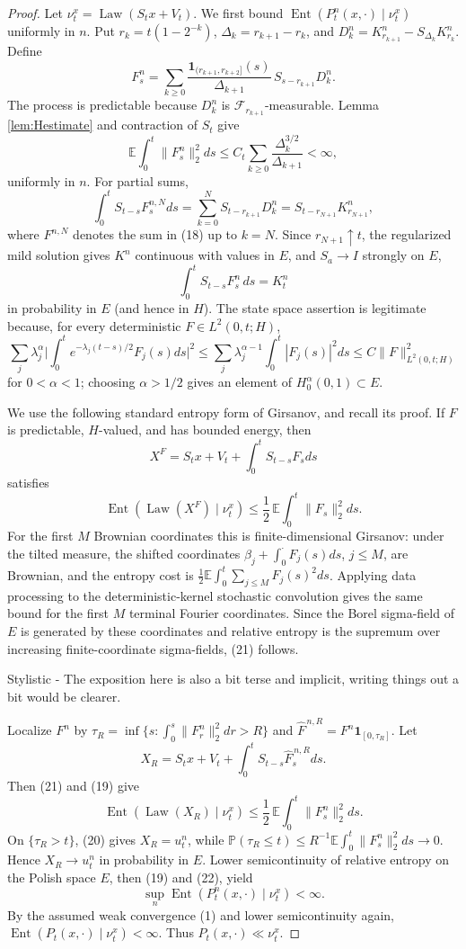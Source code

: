 \documentclass[12pt]{article}
\newcommand{\E}{\mathbb E}
\newcommand{\1}{\mathbf 1}
\newcommand{\Law}{\operatorname{Law}}
\newcommand{\calF}{\mathcal F}
\newcommand{\Ent}{\operatorname{Ent}}
\newcommand{\review}[1]{\begin{reviewbox}#1\end{reviewbox}}
\begin{document}
\begin{proof}
Let \(\nu_t^x=\Law(S_tx+V_t)\).  We first bound
\(\Ent(P_t^n(x,\cdot)\mid\nu_t^x)\) uniformly in \(n\).  Put
\(r_k=t(1-2^{-k})\), \(\Delta_k=r_{k+1}-r_k\), and
\(D_k^n=K^n_{r_{k+1}}-S_{\Delta_k}K^n_{r_k}\).  Define
\[
 F_s^n=\sum_{k\ge0}\frac{\1_{(r_{k+1},r_{k+2}]}(s)}{\Delta_{k+1}}\,
        S_{s-r_{k+1}}D_k^n .                                \tag{18}
\]
The process is predictable because \(D_k^n\) is \(\calF_{r_{k+1}}\)-measurable.
Lemma \ref{lem:Hestimate} and contraction of \(S_t\) give
\[
 \E\int_0^t\|F_s^n\|_2^2ds
 \le C_t\sum_{k\ge0}\frac{\Delta_k^{3/2}}{\Delta_{k+1}}<\infty, \tag{19}
\]
uniformly in \(n\).  For partial sums,
\[
 \int_0^tS_{t-s}F_s^{n,N}ds
 =\sum_{k=0}^NS_{t-r_{k+1}}D_k^n
 =S_{t-r_{N+1}}K^n_{r_{N+1}},
\]
where \(F^{n,N}\) denotes the sum in (18) up to \(k=N\).  Since
\(r_{N+1}\uparrow t\), the regularized mild solution gives \(K^n\) continuous
with values in \(E\), and \(S_a\to I\) strongly on \(E\),
\[
        \int_0^tS_{t-s}F_s^n\,ds=K_t^n                       \tag{20}
\]
in probability in \(E\) (and hence in \(H\)).  The state space assertion is
legitimate because, for every deterministic \(F\in L^2(0,t;H)\),
\[
 \sum_j\lambda_j^\alpha\Big|\int_0^te^{-\lambda_j(t-s)/2}F_j(s)ds\Big|^2
 \le \sum_j\lambda_j^{\alpha-1}\int_0^t|F_j(s)|^2ds
 \le C\|F\|_{L^2(0,t;H)}^2
\]
for \(0<\alpha<1\); choosing \(\alpha>1/2\) gives an element of
\(H^\alpha_0(0,1)\subset E\).

We use the following standard entropy form of Girsanov, and recall its proof.
If \(F\) is predictable, \(H\)-valued, and has bounded energy, then
\[
 X^F=S_tx+V_t+\int_0^tS_{t-s}F_sds
\]
satisfies
\[
        \Ent(\Law(X^F)\mid\nu_t^x)
        \le \frac12\,\E\int_0^t\|F_s\|_2^2ds .               \tag{21}
\]
For the first \(M\) Brownian coordinates this is finite-dimensional
Girsanov: under the tilted measure, the shifted coordinates
\(\beta_j+\int_0^\cdot F_j(s)ds\), \(j\le M\), are Brownian, and the entropy
cost is \(\frac12\E\int_0^t\sum_{j\le M}F_j(s)^2ds\).  Applying data
processing to the deterministic-kernel stochastic convolution gives the same
bound for the first \(M\) terminal Fourier coordinates.  Since the Borel
sigma-field of \(E\) is generated by these coordinates and relative entropy
is the supremum over increasing finite-coordinate sigma-fields, (21) follows. \review{Stylistic - The exposition here is also a bit terse and implicit, writing things out a bit would be clearer.}

Localize \(F^n\) by
\(\tau_R=\inf\{s:\int_0^s\|F_r^n\|_2^2dr>R\}\) and
\(\widehat F^{\,n,R}=F^n\1_{[0,\tau_R]}\).  Let
\[
 X_R=S_tx+V_t+\int_0^tS_{t-s}\widehat F^{\,n,R}_sds .
\]
Then (21) and (19) give
\[
 \Ent(\Law(X_R)\mid\nu_t^x)
 \le \frac12\,\E\int_0^t\|F_s^n\|_2^2ds .                   \tag{22}
\]
On \(\{\tau_R>t\}\), (20) gives \(X_R=u_t^n\), while
\(\mathbb P(\tau_R\le t)\le R^{-1}\E\int_0^t\|F_s^n\|_2^2ds\to0\).  Hence
\(X_R\to u_t^n\) in probability in \(E\).  Lower semicontinuity of relative
entropy on the Polish space \(E\), then (19) and (22), yield
\[
        \sup_n\Ent(P_t^n(x,\cdot)\mid\nu_t^x)<\infty .       \tag{23}
\]
By the assumed weak convergence (1) and lower semicontinuity again,
\(\Ent(P_t(x,\cdot)\mid\nu_t^x)<\infty\).  Thus
\(P_t(x,\cdot)\ll\nu_t^x\).


\end{proof}
\end{document}
